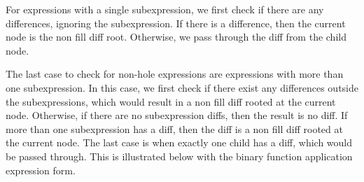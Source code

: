 \begin{singlespace}
\end{singlespace}

For expressions with a single subexpression, we first check if there are any differences, ignoring the subexpression. If there is a difference, then the current node is the non fill diff root. Otherwise, we pass through the diff from the child node.

\begin{singlespace}
\end{singlespace}

The last case to check for non-hole expressions are expressions with more than one subexpression. In this case, we first check if there exist any differences outside the subexpressions, which would result in a non fill diff rooted at the current node. Otherwise, if there are no subexpression diffs, then the result is no diff. If more than one subexpression has a diff, then the diff is a non fill diff rooted at the current node. The last case is when exactly one child has a diff, which would be passed through. This is illustrated below with the binary function application expression form.

\begin{singlespace}
\end{singlespace}

